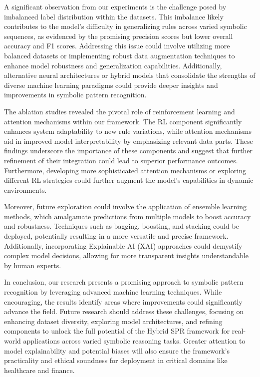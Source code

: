 \documentclass{article}
\begin{document}
A significant observation from our experiments is the challenge posed by imbalanced label distribution within the datasets. This imbalance likely contributes to the model's difficulty in generalizing rules across varied symbolic sequences, as evidenced by the promising precision scores but lower overall accuracy and F1 scores. Addressing this issue could involve utilizing more balanced datasets or implementing robust data augmentation techniques to enhance model robustness and generalization capabilities. Additionally, alternative neural architectures or hybrid models that consolidate the strengths of diverse machine learning paradigms could provide deeper insights and improvements in symbolic pattern recognition.

The ablation studies revealed the pivotal role of reinforcement learning and attention mechanisms within our framework. The RL component significantly enhances system adaptability to new rule variations, while attention mechanisms aid in improved model interpretability by emphasizing relevant data parts. These findings underscore the importance of these components and suggest that further refinement of their integration could lead to superior performance outcomes. Furthermore, developing more sophisticated attention mechanisms or exploring different RL strategies could further augment the model's capabilities in dynamic environments.

Moreover, future exploration could involve the application of ensemble learning methods, which amalgamate predictions from multiple models to boost accuracy and robustness. Techniques such as bagging, boosting, and stacking could be deployed, potentially resulting in a more versatile and precise framework. Additionally, incorporating Explainable AI (XAI) approaches could demystify complex model decisions, allowing for more transparent insights understandable by human experts.

In conclusion, our research presents a promising approach to symbolic pattern recognition by leveraging advanced machine learning techniques. While encouraging, the results identify areas where improvements could significantly advance the field. Future research should address these challenges, focusing on enhancing dataset diversity, exploring model architectures, and refining components to unlock the full potential of the Hybrid SPR framework for real-world applications across varied symbolic reasoning tasks. Greater attention to model explainability and potential biases will also ensure the framework's practicality and ethical soundness for deployment in critical domains like healthcare and finance.
\end{document}
